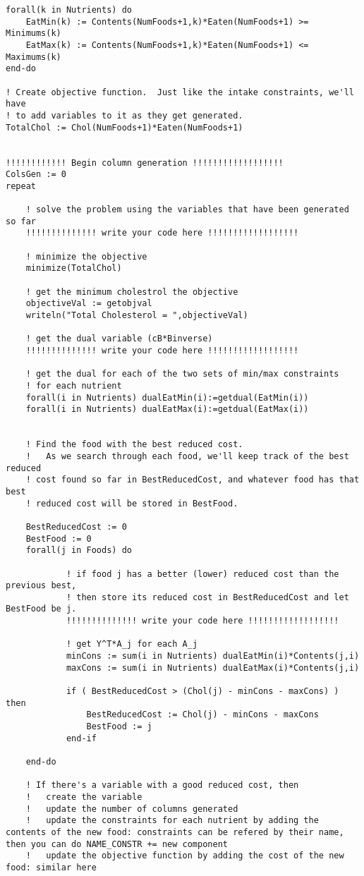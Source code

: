 \documentclass[twoside,12pt]{article}
\begin{document}
\begin{verbatim}
forall(k in Nutrients) do
	EatMin(k) := Contents(NumFoods+1,k)*Eaten(NumFoods+1) >= Minimums(k)
	EatMax(k) := Contents(NumFoods+1,k)*Eaten(NumFoods+1) <= Maximums(k)
end-do

! Create objective function.  Just like the intake constraints, we'll have 
! to add variables to it as they get generated.
TotalChol := Chol(NumFoods+1)*Eaten(NumFoods+1)

	
!!!!!!!!!!!! Begin column generation !!!!!!!!!!!!!!!!!!
ColsGen := 0
repeat	
	
	! solve the problem using the variables that have been generated so far	
	!!!!!!!!!!!!!! write your code here !!!!!!!!!!!!!!!!!!
	
	! minimize the objective	
	minimize(TotalChol)
	
	! get the minimum cholestrol the objective
	objectiveVal := getobjval
	writeln("Total Cholesterol = ",objectiveVal)

	! get the dual variable (cB*Binverse)
	!!!!!!!!!!!!!! write your code here !!!!!!!!!!!!!!!!!!
		
	! get the dual for each of the two sets of min/max constraints 
	! for each nutrient
	forall(i in Nutrients) dualEatMin(i):=getdual(EatMin(i))
	forall(i in Nutrients) dualEatMax(i):=getdual(EatMax(i))
	
		
	! Find the food with the best reduced cost.
	!   As we search through each food, we'll keep track of the best reduced
	! cost found so far in BestReducedCost, and whatever food has that best
	! reduced cost will be stored in BestFood.
	
	BestReducedCost := 0
	BestFood := 0
	forall(j in Foods) do		
	
			! if food j has a better (lower) reduced cost than the previous best,
			! then store its reduced cost in BestReducedCost and let BestFood be j.
			!!!!!!!!!!!!!! write your code here !!!!!!!!!!!!!!!!!!
	
			! get Y^T*A_j for each A_j 
			minCons := sum(i in Nutrients) dualEatMin(i)*Contents(j,i)
			maxCons := sum(i in Nutrients) dualEatMax(i)*Contents(j,i)
	
			if ( BestReducedCost > (Chol(j) - minCons - maxCons) ) then
				BestReducedCost := Chol(j) - minCons - maxCons
				BestFood := j				
			end-if			
	
	end-do

	! If there's a variable with a good reduced cost, then
	! 	create the variable
	!	update the number of columns generated
	!	update the constraints for each nutrient by adding the contents of the new food: constraints can be refered by their name, then you can do NAME_CONSTR += new component
	!	update the objective function by adding the cost of the new food: similar here
	

\end{verbatim}
\end{document}
